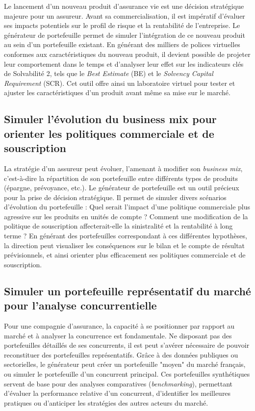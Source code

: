 Le lancement d'un nouveau produit d'assurance vie est une décision stratégique majeure pour un assureur. Avant sa commercialisation, il est impératif d'évaluer ses impacts potentiels sur le profil de risque et la rentabilité de l'entreprise. Le générateur de portefeuille permet de simuler l'intégration de ce nouveau produit au sein d'un portefeuille existant. En générant des milliers de polices virtuelles conformes aux caractéristiques du nouveau produit, il devient possible de projeter leur comportement dans le temps et d'analyser leur effet sur les indicateurs clés de Solvabilité 2, tels que le \textit{Best Estimate} (BE) et le \textit{Solvency Capital Requirement} (SCR). Cet outil offre ainsi un laboratoire virtuel pour tester et ajuster les caractéristiques d'un produit avant même sa mise sur le marché.

\subsection{Simuler l'évolution du business mix pour orienter les politiques commerciale et de souscription}

La stratégie d'un assureur peut évoluer, l'amenant à modifier son \textit{business mix}, c'est-à-dire la répartition de son portefeuille entre différents types de produits (épargne, prévoyance, etc.). Le générateur de portefeuille est un outil précieux pour la prise de décision stratégique. Il permet de simuler divers scénarios d'évolution du portefeuille : Quel serait l'impact d'une politique commerciale plus agressive sur les produits en unités de compte ? Comment une modification de la politique de souscription affecterait-elle la sinistralité et la rentabilité à long terme ? En générant des portefeuilles correspondant à ces différentes hypothèses, la direction peut visualiser les conséquences sur le bilan et le compte de résultat prévisionnels, et ainsi orienter plus efficacement ses politiques commerciale et de souscription.

\subsection{Simuler un portefeuille représentatif du marché pour l'analyse concurrentielle}

Pour une compagnie d'assurance, la capacité à se positionner par rapport au marché et à analyser la concurrence est fondamentale. Ne disposant pas des portefeuilles détaillés de ses concurrents, il est peut s'avérer nécessaire de pouvoir reconstituer des portefeuilles représentatifs. Grâce à des données publiques ou sectorielles, le générateur peut créer un portefeuille "moyen" du marché français, ou simuler le portefeuille d'un concurrent principal. Ces portefeuilles synthétiques servent de base pour des analyses comparatives (\textit{benchmarking}), permettant d'évaluer la performance relative d'un concurrent, d'identifier les meilleures pratiques ou d'anticiper les stratégies des autres acteurs du marché.


